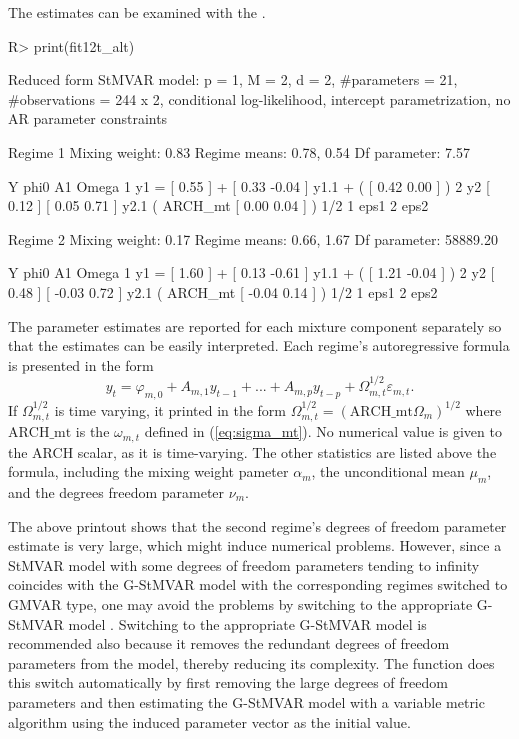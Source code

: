 \documentclass[nojss]{jss} %
\begin{document}
The estimates can be examined with the .
%
\begin{Schunk}
\begin{Sinput}
R> print(fit12t_alt)
\end{Sinput}
\begin{Soutput}
Reduced form StMVAR model:
 p = 1, M = 2, d = 2, #parameters = 21, #observations = 244 x 2,
 conditional log-likelihood, intercept parametrization, no AR parameter constraints 

Regime 1
Mixing weight: 0.83 
Regime means: 0.78, 0.54
Df parameter:  7.57

   Y     phi0          A1                            Omega         
1 y1 = [ 0.55 ] + [  0.33 -0.04 ] y1.1 + (         [  0.42 0.00 ] )
2 y2   [ 0.12 ]   [  0.05  0.71 ] y2.1   ( ARCH_mt [  0.00 0.04 ] )
  1/2     
1     eps1
2     eps2

Regime 2
Mixing weight: 0.17 
Regime means: 0.66, 1.67
Df parameter:  58889.20

   Y     phi0          A1                            Omega          
1 y1 = [ 1.60 ] + [  0.13 -0.61 ] y1.1 + (         [  1.21 -0.04 ] )
2 y2   [ 0.48 ]   [ -0.03  0.72 ] y2.1   ( ARCH_mt [ -0.04  0.14 ] )
  1/2     
1     eps1
2     eps2
\end{Soutput}
\end{Schunk}
%
The parameter estimates are reported for each mixture component separately so that the estimates can be easily interpreted. Each regime's autoregressive formula is presented in the form
\begin{equation}
y_t = \varphi_{m,0} + A_{m,1}y_{t - 1} + ... + A_{m,p}y_{t - p} + \Omega_{m,t}^{1/2}\varepsilon_{m,t}.
\end{equation}
If $\Omega_{m,t}^{1/2}$ is time varying, it printed in the form $\Omega_{m,t}^{1/2}=(\text{ARCH\_mt}\Omega_m)^{1/2}$ where $\text{ARCH\_mt}$ is the $\omega_{m,t}$ defined in (\ref{eq:sigma_mt}). No numerical value is given to the ARCH scalar, as it is time-varying. The other statistics are listed above the formula, including the mixing weight pameter $\alpha_m$, the unconditional mean $\mu_m$, and the degrees freedom parameter $\nu_m$.

The above printout shows that the second regime's degrees of freedom parameter estimate is very large, which might induce numerical problems. However, since a StMVAR model with some degrees of freedom parameters tending to infinity coincides with the G-StMVAR model with the corresponding regimes switched to GMVAR type, one may avoid the problems by switching to the appropriate G-StMVAR model \citep[see][]{Virolainen2:2021}. Switching to the appropriate G-StMVAR model is recommended also because it removes the redundant degrees of freedom parameters from the model, thereby reducing its complexity. The function  does this switch automatically by first removing the large degrees of freedom parameters and then estimating the G-StMVAR model with a variable metric algorithm \citep[algorithm 21]{Nash:1990} using the induced parameter vector as the initial value.
\end{document}
